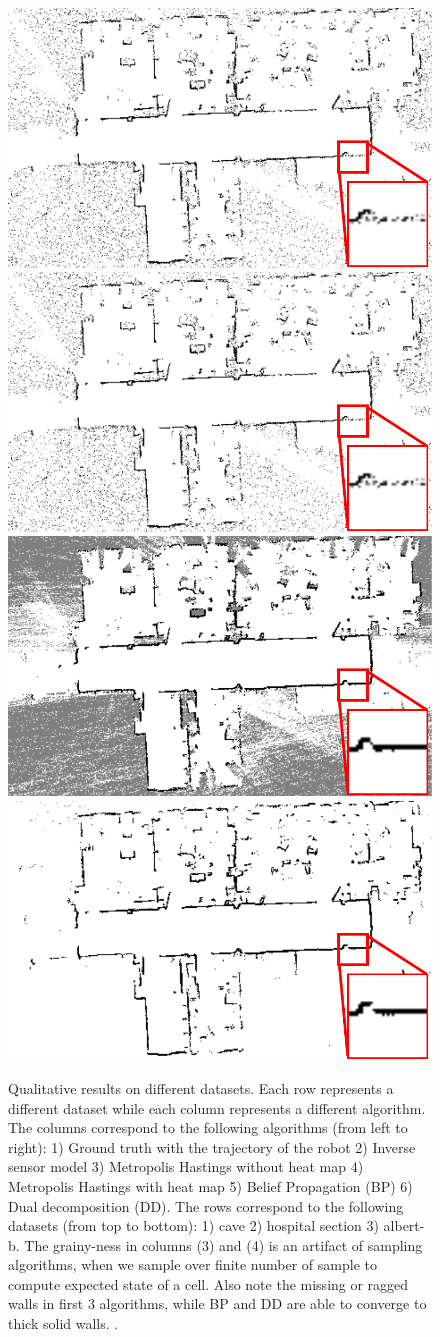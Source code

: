 \documentclass[letterpaper, 10 pt, conference]{ieeeconf} %
\begin{document}
\begin{figure}
  \includegraphics[height=0.16\textwidth, angle=90]{../figures/zoomAndShow/zoomAndShowSICKDDMCMC.pdf}%
  \includegraphics[height=0.16\textwidth, angle=90]{../figures/zoomAndShow/zoomAndShowSICKDDMCMC.pdf}%
  \includegraphics[height=0.16\textwidth, angle=90]{../figures/zoomAndShow/zoomAndShowBP.pdf}%
  \includegraphics[height=0.16\textwidth, angle=90]{../figures/zoomAndShow/zoomAndShowDD.pdf}%
  \caption{Qualitative results on different datasets. Each row represents a
    different dataset while each column represents a different algorithm. The
    columns correspond to the following algorithms (from left to right): 1)
    Ground truth with the trajectory of the robot 2) Inverse sensor model
  3) Metropolis Hastings without heat map 4) Metropolis Hastings with heat map
  5) Belief Propagation (BP) 6) Dual decomposition (DD). The rows correspond to
  the following datasets (from top to bottom): 
  1) cave 
  2) hospital section 
  3) albert-b. The grainy-ness in columns (3) and (4) is an artifact of
  sampling algorithms, when we sample over finite number of sample to compute 
  expected state of a cell. Also note the missing or ragged walls in first 3
  algorithms, while BP and DD are able to converge to thick solid walls.
\cite{howard2003radish}.}
  \label{fig:convergence-comparison-visuals}
\end{figure}



  
\end{document}
